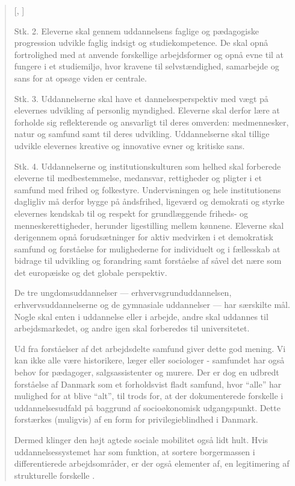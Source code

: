 \blockquote{[, \cite{uddannelsesministerietBekendtgorelseAfLov2019}]{

Stk. 2. Eleverne skal gennem uddannelsens faglige og pædagogiske progression udvikle faglig indsigt og studiekompetence. De skal opnå fortrolighed med at anvende forskellige arbejdsformer og opnå evne til at fungere i et studiemiljø, hvor kravene til selvstændighed, samarbejde og sans for at opsøge viden er centrale.

Stk. 3. Uddannelserne skal have et dannelsesperspektiv med vægt på elevernes udvikling af personlig myndighed. Eleverne skal derfor lære at forholde sig reflekterende og ansvarligt til deres omverden: medmennesker, natur og samfund samt til deres udvikling. Uddannelserne skal tillige udvikle elevernes kreative og innovative evner og kritiske sans.

Stk. 4. Uddannelserne og institutionskulturen som helhed skal forberede eleverne til medbestemmelse, medansvar, rettigheder og pligter i et samfund med frihed og folkestyre. Undervisningen og hele institutionens dagligliv må derfor bygge på åndsfrihed, ligeværd og demokrati og styrke elevernes kendskab til og respekt for grundlæggende friheds- og menneskerettigheder, herunder ligestilling mellem kønnene. Eleverne skal derigennem opnå forudsætninger for aktiv medvirken i et demokratisk samfund og forståelse for mulighederne for individuelt og i fællesskab at bidrage til udvikling og forandring samt forståelse af såvel det nære som det europæiske og det globale perspektiv.
}

De tre ungdomsuddannelser --- erhvervsgrunduddannelsen, erhvervsuddannelserne og de gymnasiale uddannelser —  har særskilte mål. Nogle skal enten i uddannelse eller i arbejde, andre skal uddannes til arbejdsmarkedet, og andre igen skal forberedes til universitetet.

Ud fra forståelser af det arbejdsdelte samfund giver dette god mening.
Vi kan ikke alle være historikere, læger eller sociologer - samfundet har også behov for pædagoger, salgsassistenter og murere.
Der er dog en udbredt forståelse af Danmark som et forholdsvist fladt samfund, hvor “alle” har mulighed for at blive “alt”, til trods for, at der dokumenterede forskelle i uddannelsesudfald på baggrund af socioøkonomisk udgangspunkt.
Dette forstærkes (muligvis) af en form for privilegieblindhed i Danmark.  

Dermed klinger den højt agtede sociale mobilitet også lidt hult.
Hvis uddannelsessystemet har som funktion, at sortere borgermassen i differentierede arbejdsområder, er der også elementer af, en legitimering af strukturelle forskelle .


}
